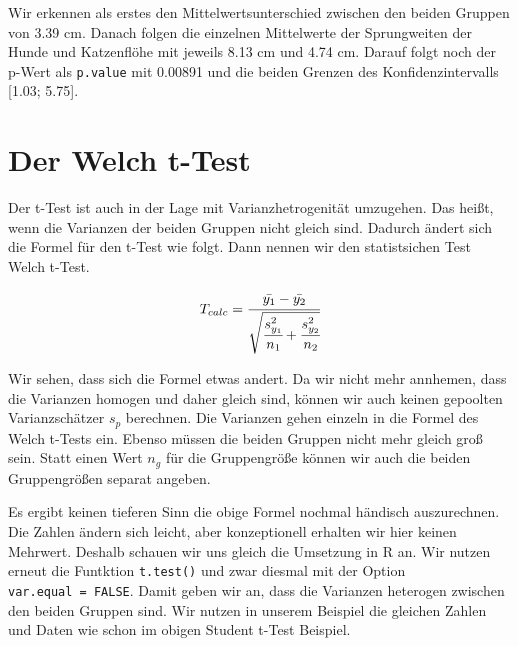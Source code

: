 \documentclass[
  letterpaper,
  DIV=11,
  oneside]{scrreport}
\begin{document}
Wir erkennen als erstes den Mittelwertsunterschied zwischen den beiden
Gruppen von 3.39 cm. Danach folgen die einzelnen Mittelwerte der
Sprungweiten der Hunde und Katzenflöhe mit jeweils 8.13 cm und 4.74 cm.
Darauf folgt noch der p-Wert als \texttt{p.value} mit 0.00891 und die
beiden Grenzen des Konfidenzintervalls {[}1.03; 5.75{]}.

\hypertarget{der-welch-t-test}{%
\section{Der Welch t-Test}\label{der-welch-t-test}}

Der t-Test ist auch in der Lage mit Varianzhetrogenität umzugehen. Das
heißt, wenn die Varianzen der beiden Gruppen nicht gleich sind. Dadurch
ändert sich die Formel für den t-Test wie folgt. Dann nennen wir den
statistsichen Test Welch t-Test.

\[
T_{calc} = \cfrac{\bar{y_1} - \bar{y_2}}{\sqrt{\cfrac{s^2_{y_1}}{n_1} + \cfrac{s^2_{y_2}}{n_2}}}
\]

Wir sehen, dass sich die Formel etwas andert. Da wir nicht mehr
annhemen, dass die Varianzen homogen und daher gleich sind, können wir
auch keinen gepoolten Varianzschätzer \(s_p\) berechnen. Die Varianzen
gehen einzeln in die Formel des Welch t-Tests ein. Ebenso müssen die
beiden Gruppen nicht mehr gleich groß sein. Statt einen Wert \(n_g\) für
die Gruppengröße können wir auch die beiden Gruppengrößen separat
angeben.


Es ergibt keinen tieferen Sinn die obige Formel nochmal händisch
auszurechnen. Die Zahlen ändern sich leicht, aber konzeptionell erhalten
wir hier keinen Mehrwert. Deshalb schauen wir uns gleich die Umsetzung
in R an. Wir nutzen erneut die Funtktion \texttt{t.test()} und zwar
diesmal mit der Option \texttt{var.equal\ =\ FALSE}. Damit geben wir an,
dass die Varianzen heterogen zwischen den beiden Gruppen sind. Wir
nutzen in unserem Beispiel die gleichen Zahlen und Daten wie schon im
obigen Student t-Test Beispiel.
\end{document}
